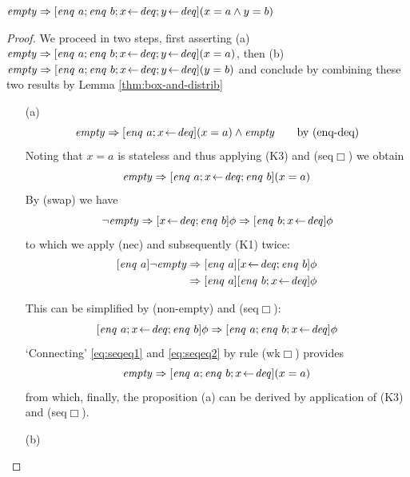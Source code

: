 \begin{prop}
 $\mathit{empty} \Rightarrow [\mathit{enq}~a; \mathit{enq}~b; x \!\gets\! \mathit{deq}; y \!\gets\! \mathit{deq}](x=a \land y=b)$
\end{prop}

\begin{proof}
  We proceed in two steps, first asserting (a) $\mathit{empty} \Rightarrow [\mathit{enq}~a; \mathit{enq}~b; x \!\gets\!
  \mathit{deq}; y \!\gets\! \mathit{deq}](x=a)$, then (b) $\mathit{empty} \Rightarrow [\mathit{enq}~a; \mathit{enq}~b; x \!\gets\! \mathit{deq};
  y \!\gets\! \mathit{deq}](y=b)$ and conclude by combining these two results by Lemma
  \ref{thm:box-and-distrib}

\begin{itemize}
\item[(a)]
\[
\mathit{empty} \Rightarrow [\mathit{enq}~a; x\!\gets\! \mathit{deq}](x=a) \land \mathit{empty} \qquad \text{by (enq-deq)}
\]
Noting that $x=a$ is stateless and thus applying (K3) and (seq$\Box$) we
obtain
\begin{equation}
\label{eq:seqeq1}
\mathit{empty} \Rightarrow [\mathit{enq}~a; x\!\gets\!\mathit{deq}; \mathit{enq}~b](x=a)
\end{equation}
By (swap) we have
\[
\lnot \mathit{empty} \Rightarrow [x\!\gets\! \mathit{deq}; \mathit{enq}~b]\phi \Rightarrow [\mathit{enq}~b; x\!\gets\!\mathit{deq}]\phi
\]
to which we apply (nec) and subsequently (K1) twice:
\[ \begin{split}
  [\mathit{enq}~a]\lnot \mathit{empty} \Rightarrow 
   [\mathit{enq}~a][x\!\gets\! \mathit{deq}; \mathit{enq}~b]\phi \\
  \Rightarrow [\mathit{enq}~a][\mathit{enq}~b; x\!\gets\! \mathit{deq}]\phi
\end{split} \]

This can be simplified by (non-empty) and (seq$\Box$):
\begin{equation}
\label{eq:seqeq2}
[\mathit{enq}~a; x\!\gets\! \mathit{deq}; \mathit{enq}~b]\phi \Rightarrow [\mathit{enq}~a; \mathit{enq}~b; x\!\gets\! \mathit{deq}]\phi
\end{equation}
`Connecting' \eqref{eq:seqeq1} and \eqref{eq:seqeq2} by rule (wk$\Box$) provides
\[\mathit{empty} \Rightarrow [\mathit{enq}~a; \mathit{enq}~b; x\!\gets\! \mathit{deq}](x=a)\]
from which, finally, the proposition (a) can be derived by application of (K3)
and (seq$\Box$).

\item[(b)]


\end{itemize}
\end{proof}
